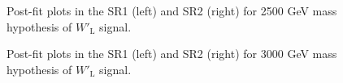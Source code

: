 \begin{figure}[H]
  \centering
  \caption{Post-fit plots in the SR1 (left) and SR2 (right) for 2500 GeV mass hypothesis of $W'_{\text{L}}$ signal.}
  \label{fig:Postfit_WpLH2500_Asimov}
\end{figure}
\begin{figure}[H]
  \centering
  \caption{Post-fit plots in the SR1 (left) and SR2 (right) for 3000 GeV mass hypothesis of $W'_{\text{L}}$ signal.}
  \label{fig:Postfit_WpLH3000_Asimov}
\end{figure}
